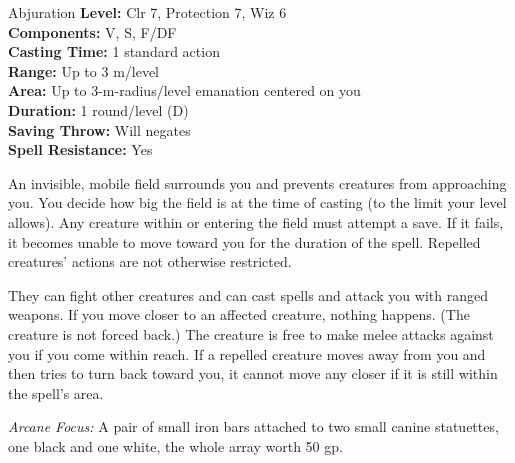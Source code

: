{Abjuration}
{
	\textbf{Level:}
	Clr 7, Protection 7, Wiz 6\\
	\textbf{Components:}
	V, S, F/DF\\
	\textbf{Casting Time:}
	1 standard action\\
	\textbf{Range:}
	Up to 3 m/level\\
	\textbf{Area:}
	Up to 3-m-radius/level emanation centered on you\\
	\textbf{Duration:}
	1 round/level (D)\\
	\textbf{Saving Throw:}
	Will negates\\
	\textbf{Spell Resistance:}
	Yes\\
}
{
	An invisible, mobile field surrounds you and prevents creatures from approaching you. You decide how big the field is at the time of casting (to the limit your level allows). Any creature within or entering the field must attempt a save. If it fails, it becomes unable to move toward you for the duration of the spell. Repelled creatures' actions are not otherwise restricted.

	They can fight other creatures and can cast spells and attack you with ranged weapons. If you move closer to an affected creature, nothing happens. (The creature is not forced back.) The creature is free to make melee attacks against you if you come within reach. If a repelled creature moves away from you and then tries to turn back toward you, it cannot move any closer if it is still within the spell's area.

	\textit{Arcane Focus:}
	A pair of small iron bars attached to two small canine statuettes, one black and one white, the whole array worth 50 gp.

}
